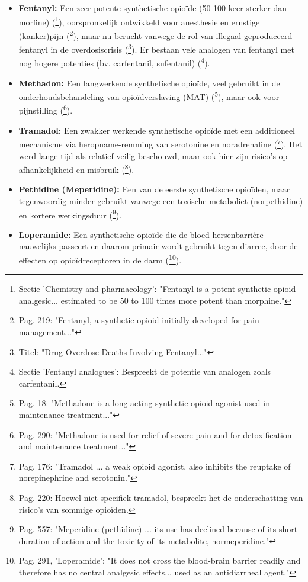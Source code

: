 \documentclass[11pt, a4paper]{report} %
\begin{document}
\begin{itemize}
        \begin{itemize}
            \item \textbf{Fentanyl:} Een zeer potente synthetische opioïde (50-100 keer sterker dan morfine) (\cite{EMCDDAFentanylProfile}\footnote{Sectie 'Chemistry and pharmacology': "Fentanyl is a potent synthetic opioid analgesic... estimated to be 50 to 100 times more potent than morphine."}), oorspronkelijk ontwikkeld voor anesthesie en ernstige (kanker)pijn (\cite{Volkow2021ChangingOpioidCrisis}\footnote{Pag. 219: "Fentanyl, a synthetic opioid initially developed for pain management..."}), maar nu berucht vanwege de rol van illegaal geproduceerd fentanyl in de overdosiscrisis (\cite{CDC2022DataBrief457}\footnote{Titel: "Drug Overdose Deaths Involving Fentanyl..."}). Er bestaan vele analogen van fentanyl met nog hogere potenties (bv. carfentanil, sufentanil) (\cite{EMCDDAFentanylProfile}\footnote{Sectie 'Fentanyl analogues': Bespreekt de potentie van analogen zoals carfentanil.}).
            \item \textbf{Methadon:} Een langwerkende synthetische opioïde, veel gebruikt in de onderhoudsbehandeling van opioïdverslaving (MAT) (\cite{Kosten2002NeurobiologyDependence}\footnote{Pag. 18: "Methadone is a long-acting synthetic opioid agonist used in maintenance treatment..."}), maar ook voor pijnstilling (\cite{Gupta2010ChemistryOpioids}\footnote{Pag. 290: "Methadone is used for relief of severe pain and for detoxification and maintenance treatment..."}).
            \item \textbf{Tramadol:} Een zwakker werkende synthetische opioïde met een additioneel mechanisme via heropname-remming van serotonine en noradrenaline (\cite{Riley2008OxycodoneReview}\footnote{Pag. 176: "Tramadol ... a weak opioid agonist, also inhibits the reuptake of norepinephrine and serotonin."}). Het werd lange tijd als relatief veilig beschouwd, maar ook hier zijn risico's op afhankelijkheid en misbruik (\cite{Volkow2021ChangingOpioidCrisis}\footnote{Pag. 220: Hoewel niet specifiek tramadol, bespreekt het de onderschatting van risico's van sommige opioïden.}).
            \item \textbf{Pethidine (Meperidine):} Een van de eerste synthetische opioïden, maar tegenwoordig minder gebruikt vanwege een toxische metaboliet (norpethidine) en kortere werkingsduur (\cite{GutsteinAkil2006OpioidAnalgesics}\footnote{Pag. 557: "Meperidine (pethidine) ... its use has declined because of its short duration of action and the toxicity of its metabolite, normeperidine."}).
            \item \textbf{Loperamide:} Een synthetische opioïde die de bloed-hersenbarrière nauwelijks passeert en daarom primair wordt gebruikt tegen diarree, door de effecten op opioïdreceptoren in de darm (\cite{Gupta2010ChemistryOpioids}\footnote{Pag. 291, 'Loperamide': "It does not cross the blood-brain barrier readily and therefore has no central analgesic effects... used as an antidiarrheal agent."}).
        \end{itemize}
\end{itemize}
\end{document}
